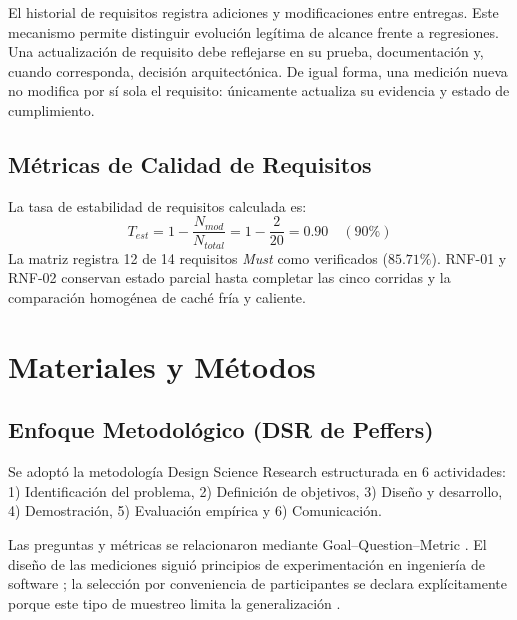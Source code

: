 \documentclass[11pt,a4paper]{report}
\begin{document}
El historial de requisitos registra adiciones y modificaciones entre entregas. Este mecanismo permite distinguir evolución legítima de alcance frente a regresiones. Una actualización de requisito debe reflejarse en su prueba, documentación y, cuando corresponda, decisión arquitectónica. De igual forma, una medición nueva no modifica por sí sola el requisito: únicamente actualiza su evidencia y estado de cumplimiento.

\section{Métricas de Calidad de Requisitos}
La tasa de estabilidad de requisitos calculada es:
\begin{equation}
    T_{est} = 1 - \frac{N_{mod}}{N_{total}} = 1 - \frac{2}{20} = 0.90 \quad (90\%)
\end{equation}
La matriz registra 12 de 14 requisitos \emph{Must} como verificados ($85.71\%$). RNF-01 y RNF-02 conservan estado parcial hasta completar las cinco corridas y la comparación homogénea de caché fría y caliente.

\chapter{Materiales y Métodos}
\section{Enfoque Metodológico (DSR de Peffers)}
Se adoptó la metodología Design Science Research \cite{peffers2007design, hevner2004design} estructurada en 6 actividades:
1) Identificación del problema, 2) Definición de objetivos, 3) Diseño y desarrollo, 4) Demostración, 5) Evaluación empírica y 6) Comunicación.

Las preguntas y métricas se relacionaron mediante Goal--Question--Metric \cite{basili1994gqm}. El diseño de las mediciones siguió principios de experimentación en ingeniería de software \cite{wohlin2012experimentation}; la selección por conveniencia de participantes se declara explícitamente porque este tipo de muestreo limita la generalización \cite{baltes2022sampling}.
\end{document}
